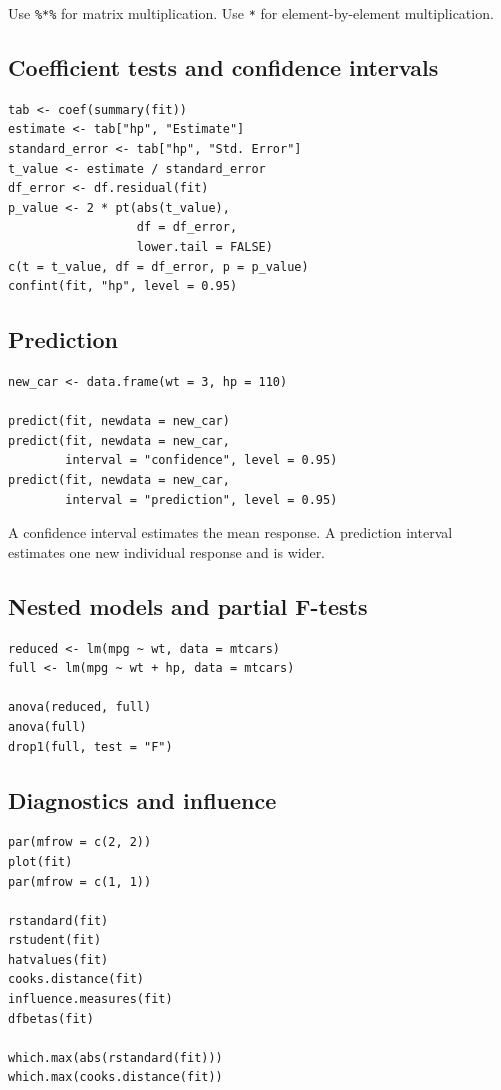 \documentclass[11pt]{article}
\begin{document}
Use \texttt{\%*\%} for matrix multiplication. Use \texttt{*} for
element-by-element multiplication.

\subsection{Coefficient tests and confidence intervals}
\begin{lstlisting}
tab <- coef(summary(fit))
estimate <- tab["hp", "Estimate"]
standard_error <- tab["hp", "Std. Error"]
t_value <- estimate / standard_error
df_error <- df.residual(fit)
p_value <- 2 * pt(abs(t_value),
                  df = df_error,
                  lower.tail = FALSE)
c(t = t_value, df = df_error, p = p_value)
confint(fit, "hp", level = 0.95)
\end{lstlisting}

\subsection{Prediction}
\begin{lstlisting}
new_car <- data.frame(wt = 3, hp = 110)

predict(fit, newdata = new_car)
predict(fit, newdata = new_car,
        interval = "confidence", level = 0.95)
predict(fit, newdata = new_car,
        interval = "prediction", level = 0.95)
\end{lstlisting}

A confidence interval estimates the mean response. A prediction interval
estimates one new individual response and is wider.

\subsection{Nested models and partial F-tests}
\begin{lstlisting}
reduced <- lm(mpg ~ wt, data = mtcars)
full <- lm(mpg ~ wt + hp, data = mtcars)

anova(reduced, full)
anova(full)
drop1(full, test = "F")
\end{lstlisting}

\subsection{Diagnostics and influence}
\begin{lstlisting}
par(mfrow = c(2, 2))
plot(fit)
par(mfrow = c(1, 1))

rstandard(fit)
rstudent(fit)
hatvalues(fit)
cooks.distance(fit)
influence.measures(fit)
dfbetas(fit)

which.max(abs(rstandard(fit)))
which.max(cooks.distance(fit))
\end{lstlisting}
\end{document}
